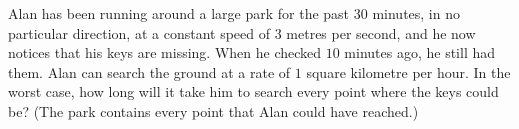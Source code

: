 Alan has been running around a large park for the past $30$ minutes, in no particular direction, at a constant speed of $3$ metres per second, and he now notices that his keys are missing. When he checked $10$ minutes ago, he still had them. Alan can search the ground at a rate of $1$ square kilometre per hour. In the worst case, how long will it take him to search every point where the keys could be? (The park contains every point that Alan could have reached.)
